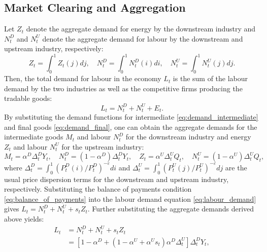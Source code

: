 \documentclass[a4paper, 12pt]{article}
\theoremstyle{definition*}
\begin{document}
\subsection{Market Clearing and Aggregation}
Let $Z_t$ denote the aggregate demand for energy by the downstream industry and $N^D_t$ and $N^U_t$ denote the aggregate demand for labour by the downstream and upstream industry, respectively:
\begin{equation}
  Z_t = \int_0^1 Z_t(j) dj, \quad N^D_t = \int_0^1 N^D_t(i) di, \quad N^U_t = \int_0^1 N^U_t(j) dj.
\end{equation}
Then, the total demand for labour in the economy $L_t$ is the sum of the labour demand by the two industries as well as the competitive firms producing the tradable goods:
\begin{equation}\label{eq:labour_demand}
  L_t = N^D_t + N^U_t + E_t.
\end{equation}
By substituting the demand functions for intermediate \eqref{eq:demand_intermediate} and final goods \eqref{eq:demand_final}, one can obtain the aggregate demands for the intermediate goods $M_t$ and labour $N^D_t$ for the downstream industry and energy $Z_t$ and labour $N^U_t$ for the upstream industry:
\begin{equation}
  M_t = \alpha^D\Delta^D_tY_t, \quad
  N^D_t = (1 - \alpha^D)\Delta^D_tY_t, \quad
  Z_t = \alpha^U\Delta^U_tQ_t, \quad
  N^U_t = (1 - \alpha^U)\Delta^U_tQ_t,
\end{equation}
where $\Delta^D_t = \int_0^1\left(P^D_t(i) / P^D_t\right)^{-\varepsilon} di$ and $\Delta^U_t = \int_0^1\left(P^U_t(j) / P^U_t\right)^{-\varepsilon} dj$ are the usual price dispersion terms for the downstream and upstream industry, respectively.
Substituting the balance of payments condition \eqref{eq:balance_of_payments} into the labour demand equation \eqref{eq:labour_demand} gives $L_t = N^D_t + N^U_t + s_tZ_t$.
Further substituting the aggregate demands derived above yields:
\begin{align}
  L_t &= N^D_t + N^U_t + s_tZ_t \\
      &= [1 - \alpha^D + (1 - \alpha^U + \alpha^Us_t)\alpha^D\Delta^U_t]\Delta^D_tY_t,
\end{align}
\end{document}

